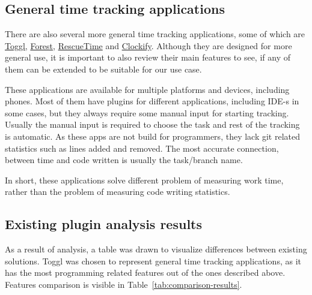 \subsection{General time tracking applications}\label{subsec:general-time-tracking-alternatives}
There are also several more general time tracking applications, some of which are
\href{https://toggl.com/}{Toggl}, \href{https://www.forestapp.cc/}{Forest}, \href{https://www.rescuetime.com/}{RescueTime} and
\href{https://clockify.me/}{Clockify}.
Although they are designed for more general use, it is important to also review their main features to see,
if any of them can be extended to be suitable for our use case.
\cite{general-time-tracking-alternatives}

These applications are available for multiple platforms and devices, including phones.
Most of them have plugins for different applications, including IDE-s in some cases, but they always require some manual
input for starting tracking.
Usually the manual input is required to choose the task and rest of the tracking is automatic.
As these apps are not build for programmers, they lack git related statistics such as lines added and removed.
The most accurate connection, between time and code written is usually the task/branch name.

In short, these applications solve different problem of measuring work time, rather than the problem of measuring
code writing statistics.

\subsection{Existing plugin analysis results}\label{subsec:existing-plugin-analysis-results}
As a result of analysis, a table was drawn to visualize differences between existing solutions.
Toggl was chosen to represent general time tracking applications, as it has the most programming related features
out of the ones described above.
Features comparison is visible in Table~\ref{tab:comparison-results}.

